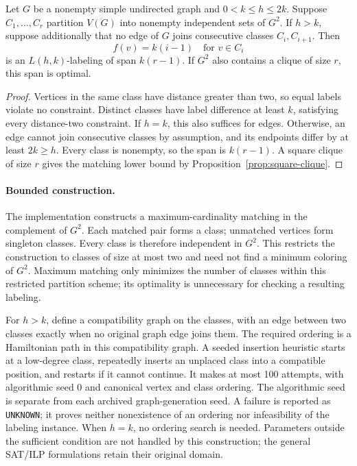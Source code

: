 \begin{proposition}
\label{prop:color-order}
Let $G$ be a nonempty simple undirected graph and $0<k\leq h\leq2k$.
Suppose $C_1,\ldots,C_r$ partition $V(G)$ into nonempty independent sets
of $G^2$. If $h>k$, suppose additionally that no edge of $G$ joins
consecutive classes $C_i,C_{i+1}$. Then
\[
 f(v)=k(i-1)\quad\text{for }v\in C_i
\]
is an $L(h,k)$-labeling of span $k(r-1)$.
If $G^2$ also contains a clique of size $r$, this span is optimal.
\end{proposition}
\begin{proof}
Vertices in the same class have distance greater than two, so equal
labels violate no constraint. Distinct classes have label difference at
least $k$, satisfying every distance-two constraint. If $h=k$, this also
suffices for edges. Otherwise, an edge cannot join consecutive classes
by assumption, and its endpoints differ by at least $2k\geq h$.
Every class is nonempty, so the span is $k(r-1)$. A square clique of size
$r$ gives the matching lower bound by Proposition~\ref{prop:square-clique}.
\end{proof}

\paragraph{Bounded construction.}
The implementation constructs a maximum-cardinality matching in the
complement of $G^2$. Each matched pair forms a class; unmatched vertices
form singleton classes. Every class is therefore independent in $G^2$.
This restricts the construction to classes of size at most two and need
not find a minimum coloring of $G^2$. Maximum matching only minimizes
the number of classes within this restricted partition scheme; its
optimality is unnecessary for checking a resulting labeling.

For $h>k$, define a compatibility graph on the classes, with an edge
between two classes exactly when no original graph edge joins them.
The required ordering is a Hamiltonian path in this compatibility graph.
A seeded insertion heuristic starts at a low-degree class, repeatedly
inserts an unplaced class into a compatible position, and restarts if
it cannot continue. It makes at most 100 attempts, with algorithmic seed 0
and canonical vertex and class ordering. The algorithmic seed is separate
from each archived graph-generation seed. A failure is reported as
\texttt{UNKNOWN}; it proves neither nonexistence of an ordering nor
infeasibility of the labeling instance. When $h=k$, no ordering search
is needed. Parameters outside the sufficient condition are not handled
by this construction; the general SAT/ILP formulations retain their
original domain.


